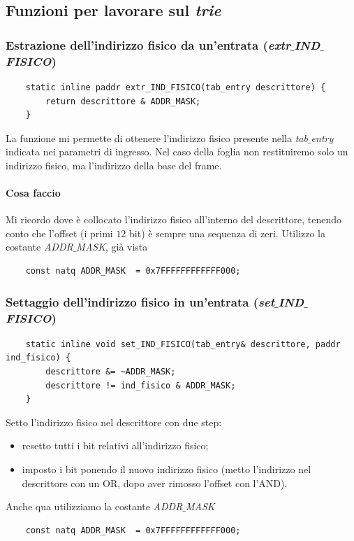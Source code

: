 \subsection{Funzioni per lavorare sul \emph{trie}}

\subsubsection{Estrazione dell'indirizzo fisico da un'entrata (\emph{extr$\_$IND$\_$FISICO})}
\small 
\begin{verbatim}
	static inline paddr extr_IND_FISICO(tab_entry descrittore) {
		return descrittore & ADDR_MASK;
	}
\end{verbatim}
\normalsize 
La funzione mi permette di ottenere l'indirizzo fisico presente nella \emph{tab$\_$entry} indicata nei parametri di ingresso. Nel caso della foglia non restituiremo solo un indirizzo fisico, ma l'indirizzo della base del frame.
\paragraph{Cosa faccio} Mi ricordo dove è collocato l'indirizzo fisico all'interno del descrittore, tenendo conto che l'offset (i primi $12$ bit) è sempre una sequenza di zeri. Utilizzo la costante \emph{ADDR$\_$MASK}, già vista
\begin{verbatim}
	const natq ADDR_MASK  = 0x7FFFFFFFFFFFF000;
\end{verbatim}
\subsubsection{Settaggio dell'indirizzo fisico in un'entrata (\emph{set$\_$IND$\_$FISICO})}
\small 
\begin{verbatim}
	static inline void set_IND_FISICO(tab_entry& descrittore, paddr ind_fisico) {
		descrittore &= ~ADDR_MASK;
		descrittore != ind_fisico & ADDR_MASK;
	}
\end{verbatim}
\normalsize 
Setto l'indirizzo fisico nel descrittore con due step:
\begin{itemize}
	\item resetto tutti i bit relativi all'indirizzo fisico;
	\item imposto i bit ponendo il nuovo indirizzo fisico (metto l'indirizzo nel descrittore con un OR, dopo aver rimosso l'offset con l'AND).
\end{itemize}
Anche qua utilizziamo la costante \emph{ADDR$\_$MASK}
\begin{verbatim}
	const natq ADDR_MASK  = 0x7FFFFFFFFFFFF000;
\end{verbatim}

